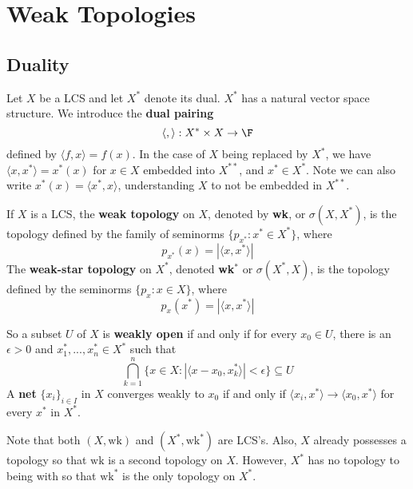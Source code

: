 %
%
%
\chapter{Weak Topologies}
\label{WeakTop} %




\section{Duality}
\label{sec:dual}


Let $X$ be a LCS and let $X^*$ denote its dual. $X^*$ has a natural vector space structure. We introduce the \textbf{dual pairing} $$\langle,\rangle:X^*\times X\rightarrow \F$$
defined by $\langle f,x\rangle = f(x)$. In the case of $X$ being replaced by $X^*$, we have $\langle x,x^*\rangle = x^*(x)$ for $x \in X$ embedded into $X^{**}$, and $x^* \in X^*$. Note we can also write $x^*(x) = \langle x^*,x\rangle$, understanding $X$ to not be embedded in $X^{**}$.

\begin{defn}
    If $X$ is a LCS, the \textbf{weak topology} on $X$, denoted by \textbf{wk}, or $\sigma(X,X^*)$, is the topology defined by the family of seminorms $\{p_{x^*}:x^* \in X^*\}$, where $$p_{x^*}(x) = |\langle x,x^*\rangle|$$
    The \textbf{weak-star topology} on $X^*$, denoted \textbf{wk$^*$} or $\sigma(X^*,X)$, is the topology defined by the seminorms $\{p_x:x \in X\}$, where $$p_x(x^*) = |\langle x,x^*\rangle|$$
\end{defn}


So a subset $U$ of $X$ is \textbf{weakly open} if and only if for every $x_0 \in U$, there is an $\epsilon > 0$ and $x_1^*,...,x_n^* \in X^*$ such that $$\bigcap_{k=1}^n\{x \in X:|\langle x-x_0,x_k^*\rangle| < \epsilon\}\subseteq U$$
A \textbf{net} $\{x_i\}_{i \in I}$ in $X$ converges weakly to $x_0$ if and only if $\langle x_i,x^*\rangle \rightarrow \langle x_0,x^*\rangle$ for every $x^*$ in $X^*$.

Note that both $(X,\text{wk})$ and $(X^*,\text{wk}^*)$ are LCS's. Also, $X$ already possesses a topology so that $\text{wk}$ is a second topology on $X$. However, $X^*$ has no topology to being with so that $\text{wk}^*$ is the only topology on $X^*$.

